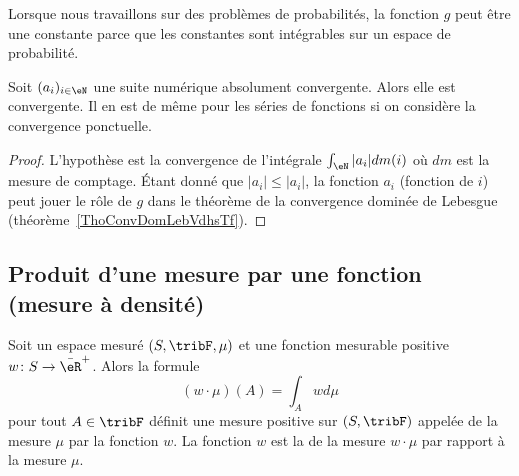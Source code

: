 \begin{remark}
    Lorsque nous travaillons sur des problèmes de probabilités, la fonction \( g\) peut être une constante parce que les constantes sont intégrables sur un espace de probabilité.
\end{remark}

\begin{corollary}       \label{CorCvAbsNormwEZdRc}
    Soit \( (a_i)_{i\in \eN}\) une suite numérique absolument convergente. Alors elle est convergente. Il en est de même pour les séries de fonctions si on considère la convergence ponctuelle.
\end{corollary}

\begin{proof}
    L'hypothèse est la convergence de l'intégrale \( \int_{\eN}| a_i |dm(i)\) où \( dm\) est la mesure de comptage. Étant donné que \( | a_i |\leq | a_i |\), la fonction \( a_i\) (fonction de \( i\)) peut jouer le rôle de \( g\) dans le théorème de la convergence dominée de Lebesgue (théorème~\ref{ThoConvDomLebVdhsTf}).
\end{proof}

\subsection{Produit d'une mesure par une fonction (mesure à densité)}

\begin{propositionDef}\label{PropooVXPMooGSkyBo}
    Soit un espace mesuré \( (S,\tribF,\mu)\) et une fonction mesurable positive \( w\colon S\to \bar\eR^+\). Alors la formule
    \begin{equation}
        (w\cdot \mu)(A)=\int_Awd\mu
    \end{equation}
    pour tout \( A\in \tribF\) définit une mesure positive sur \( (S,\tribF)\) appelée  de la mesure \( \mu\) par la fonction \( w\). La fonction \( w\) est la  de la mesure \( w\cdot \mu\) par rapport à la mesure \( \mu\).
\end{propositionDef}

